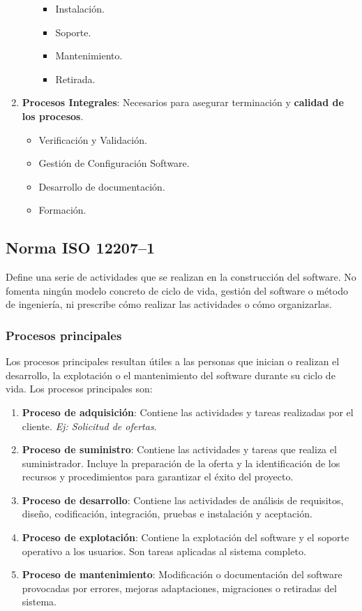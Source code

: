 \begin{enumerate}
\begin{itemize}
                    \begin{itemize}
                        \item Instalación.
                        \item Soporte.
                        \item Mantenimiento.
                        \item Retirada.
                    \end{itemize}
          \end{itemize}
    \item \textbf{Procesos Integrales}: Necesarios para asegurar terminación y \textbf{calidad de los procesos}.
          \begin{itemize}
              \item Verificación y Validación.
              \item Gestión de Configuración Software.
              \item Desarrollo de documentación.
              \item Formación.
          \end{itemize}
\end{enumerate}

\subsection{Norma ISO 12207--1}
Define una serie de actividades que se realizan en la construcción del software. No fomenta ningún modelo concreto de ciclo de vida, gestión del software o método de ingeniería, ni prescribe cómo realizar las actividades o cómo organizarlas.

\subsubsection{Procesos principales}
Los procesos principales resultan útiles a las personas que inician o realizan el desarrollo, la explotación o el mantenimiento del software durante su ciclo de vida. Los procesos principales son:
\begin{enumerate}
    \item \textbf{Proceso de adquisición}: Contiene las actividades y tareas realizadas por el cliente. \textit{Ej: Solicitud de ofertas}.
    \item \textbf{Proceso de suministro}: Contiene las actividades y tareas que realiza el suministrador. Incluye la preparación de la oferta y la identificación de los recursos y procedimientos para garantizar el éxito del proyecto.
    \item\textbf{Proceso de desarrollo}: Contiene las actividades de análisis de requisitos, diseño, codificación, integración, pruebas e instalación y aceptación.
    \item \textbf{Proceso de explotación}: Contiene la explotación del software y el soporte operativo a los usuarios. Son tareas aplicadas al sistema completo.
    \item \textbf{Proceso de mantenimiento}: Modificación o documentación del software provocadas por errores, mejoras adaptaciones, migraciones o retiradas del sistema.
\end{enumerate}


